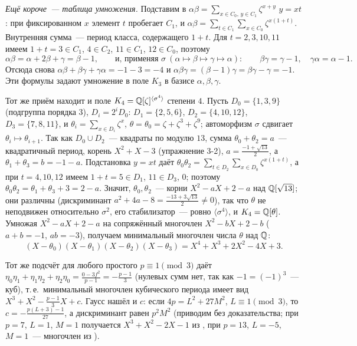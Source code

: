 \begin{example}
\emph{Ещё короче~--- таблица умножения.} Подставим в $\alpha\beta=\sum_{x\in C_0,\,y\in C_1}\zeta^{x+y}$ $y=xt$: при фиксированном $x$
элемент $t$ пробегает $C_1$, и $\alpha\beta=\sum_{t\in C_1}\sum_{x\in C_0}\zeta^{x(1+t)}$. Внутренняя сумма~--- период класса,
содержащего $1+t$. Для $t=2,3,10,11$ имеем $1+t=3\in C_1$, $4\in C_2$, $11\in C_1$, $12\in C_0$, поэтому
\[
\alpha\beta=\alpha+2\beta+\gamma=\beta-1,\qquad\text{и, применяя }\sigma\ (\alpha\mapsto\beta\mapsto\gamma\mapsto\alpha):\qquad
\beta\gamma=\gamma-1,\quad\gamma\alpha=\alpha-1 .
\]
Отсюда снова $\alpha\beta+\beta\gamma+\gamma\alpha=-1-3=-4$ и $\alpha\beta\gamma=(\beta-1)\gamma=\beta\gamma-\gamma=-1$. Эти формулы
задают умножение в поле $K_3$ в базисе $\alpha,\beta,\gamma$.
\end{example}

Тот же приём находит и поле $K_4=\mathbb Q[\zeta]^{\langle\sigma^4\rangle}$ степени $4$. Пусть $D_0=\{1,3,9\}$ (подгруппа порядка $3$),
$D_i=2^iD_0$: $D_1=\{2,5,6\}$, $D_2=\{4,10,12\}$, $D_3=\{7,8,11\}$, и $\theta_i=\sum_{x\in D_i}\zeta^x$, $\theta=\theta_0=\zeta+\zeta^3+\zeta^9$;
автоморфизм $\sigma$ сдвигает $\theta_i\mapsto\theta_{i+1}$. Так как $D_0\cup D_2$~--- квадраты по модулю $13$, сумма
$\theta_0+\theta_2=a$~--- квадратичный период, корень $X^2+X-3$ (упражнение 3-2), $a=\frac{-1+\sqrt{13}}2$, а
$\theta_1+\theta_3=b=-1-a$. Подстановка $y=xt$ даёт $\theta_0\theta_2=\sum_{t\in D_2}\sum_{x\in D_0}\zeta^{x(1+t)}$, а при $t=4,10,12$
имеем $1+t=5\in D_1$, $11\in D_3$, $0$; поэтому $\theta_0\theta_2=\theta_1+\theta_3+3=2-a$. Значит, $\theta_0,\theta_2$~--- корни
$X^2-aX+2-a$ над $\mathbb Q[\sqrt{13}]$; они различны (дискриминант $a^2+4a-8=\frac{-13+3\sqrt{13}}2\ne0$), так что $\theta$ не
неподвижен относительно $\sigma^2$, его стабилизатор~--- ровно $\langle\sigma^4\rangle$, и $K_4=\mathbb Q[\theta]$. Умножая $X^2-aX+2-a$ на
сопряжённый многочлен $X^2-bX+2-b$ ($a+b=-1$, $ab=-3$), получаем минимальный многочлен числа $\theta$ над $\mathbb Q$:
\[
(X-\theta_0)(X-\theta_1)(X-\theta_2)(X-\theta_3)=X^4+X^3+2X^2-4X+3 .
\]

Тот же подсчёт для любого простого $p\equiv1\pmod3$ даёт $\eta_0\eta_1+\eta_1\eta_2+\eta_2\eta_0=\frac{0-3f^2}{p-1}=-\frac{p-1}3$
(нулевых сумм нет, так как $-1=(-1)^3$~--- куб), т.\,е.\ минимальный многочлен кубического периода имеет вид
$X^3+X^2-\frac{p-1}3X+c$. Гаусс нашёл и $c$: если $4p=L^2+27M^2$, $L\equiv1\pmod3$, то $c=-\frac{p(L+3)-1}{27}$, а дискриминант
равен $p^2M^2$ (приводим без доказательства; при $p=7$, $L=1$, $M=1$ получается $X^3+X^2-2X-1$ из , при $p=13$,
$L=-5$, $M=1$~--- многочлен из ).

